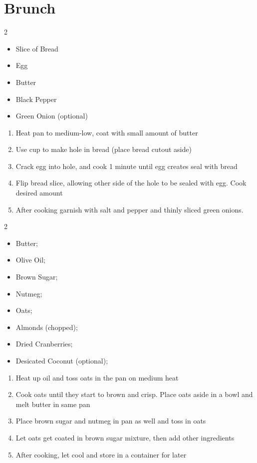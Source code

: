 \documentclass[oneside]{recipe}
\newcommand{\recipecolumn}[2]{
	\begin{multicols}{2}
	\raggedcolumns
	#1
	\columnbreak
	#2
	\end{multicols}
}
\begin{document}
\chapter{Brunch}
\recipecolumn{
	\begin{itemize}
		\item Slice of Bread
		\item Egg
		\item Butter
		\item Black Pepper
		\item Green Onion (optional)
	\end{itemize}
}{
	\begin{enumerate}
		\item Heat pan to medium-low, coat with small amount of butter
		\item Use cup to make hole in bread (place bread cutout aside)
		\item Crack egg into hole, and cook 1 minute until egg creates seal with bread
		\item Flip bread slice, allowing other side of the hole to be sealed with egg. Cook desired amount
		\item After cooking garnish with salt and pepper and thinly sliced green onions.
	\end{enumerate}
}
\newpage
{}
\recipecolumn{
	\begin{itemize}
		\item Butter;
		\item Olive Oil;
		\item Brown Sugar;
		\item Nutmeg;
		\item Oats;
		\item Almonds (chopped);
		\item Dried Cranberries;
		\item Desicated Coconut (optional);
	\end{itemize}
}{
	\begin{enumerate}
		\item Heat up oil and toss oats in the pan on medium heat
		\item Cook oats until they start to brown and crisp. Place oats aside in a bowl and melt butter in same pan
		\item Place brown sugar and nutmeg in pan as well and toss in oats
		\item Let oats get coated in brown sugar mixture, then add other ingredients
		\item After cooking, let cool and store in a container for later
	\end{enumerate}
}
\end{document}
